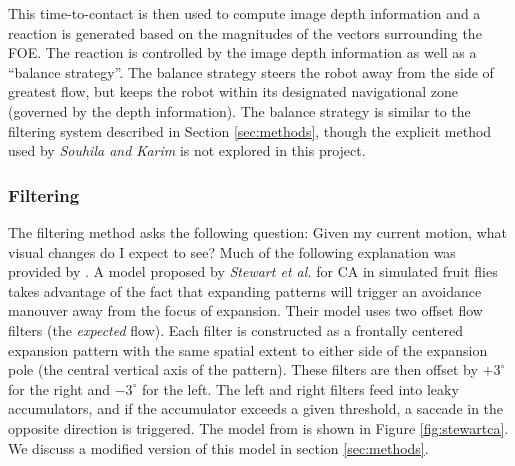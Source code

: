 \documentclass[a4paper,11pt,twoside,openright]{article}
\begin{document}
This time-to-contact is then used to compute image depth information and a reaction is generated based on the
magnitudes of the vectors surrounding the FOE. The reaction is controlled by the image depth information
as well as a ``balance strategy''. The balance strategy steers the robot away from the side of greatest
flow, but keeps the robot within its designated navigational zone (governed by the depth information). The
balance strategy is similar to the filtering system described in Section \ref{sec:methods}, though
the explicit method used by \textit{Souhila and Karim} is not explored in this project.

\subsubsection{ Filtering }
The filtering method asks the following question: Given my current motion, what visual changes do
I expect to see? Much of the following explanation was provided by \cite{Stewart2010}.
A model proposed by \textit{Stewart et al.} for CA in simulated fruit flies takes
advantage of the fact that expanding patterns will trigger an avoidance manouver away from the focus
of expansion\cite{Stewart2010}. Their model uses two offset flow filters (the \textit{expected}
flow). Each filter is constructed as a frontally centered expansion pattern with the same spatial
extent to either side of the expansion pole (the central vertical axis of the pattern). These filters
are then offset by $+3^{\circ}$ for the right and $-3^{\circ}$ for the left. The left and right
filters feed into leaky accumulators, and if the accumulator exceeds a given threshold, a saccade
in the opposite direction is triggered. The model from \cite{Stewart2010} is shown in Figure
\ref{fig:stewartca}. We discuss a modified version of this model in section
\ref{sec:methods}.
\end{document}
